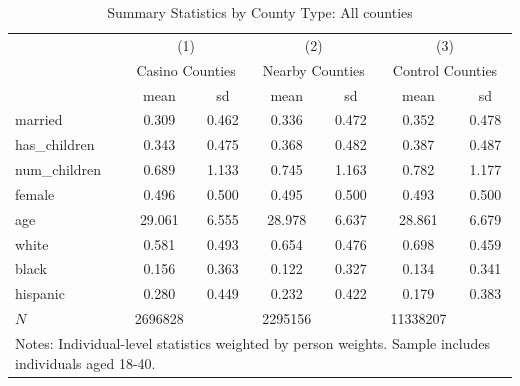 \begin{table}[htbp]\centering
\def\sym#1{\ifmmode^{#1}\else\(^{#1}\)\fi}
\caption{Summary Statistics by County Type: All counties}
\begin{tabular}{l*{3}{cc}}
\hline\hline
            &\multicolumn{2}{c}{(1)}  &\multicolumn{2}{c}{(2)}  &\multicolumn{2}{c}{(3)}  \\
            &\multicolumn{2}{c}{Casino Counties}&\multicolumn{2}{c}{Nearby Counties}&\multicolumn{2}{c}{Control Counties}\\
            &        mean&          sd&        mean&          sd&        mean&          sd\\
\hline
married     &       0.309&       0.462&       0.336&       0.472&       0.352&       0.478\\
has\_children&       0.343&       0.475&       0.368&       0.482&       0.387&       0.487\\
num\_children&       0.689&       1.133&       0.745&       1.163&       0.782&       1.177\\
female      &       0.496&       0.500&       0.495&       0.500&       0.493&       0.500\\
age         &      29.061&       6.555&      28.978&       6.637&      28.861&       6.679\\
white       &       0.581&       0.493&       0.654&       0.476&       0.698&       0.459\\
black       &       0.156&       0.363&       0.122&       0.327&       0.134&       0.341\\
hispanic    &       0.280&       0.449&       0.232&       0.422&       0.179&       0.383\\
\hline
\(N\)       &     2696828&            &     2295156&            &    11338207&            \\
\hline\hline
\multicolumn{7}{l}{\footnotesize Notes: Individual-level statistics weighted by person weights. Sample includes individuals aged 18-40.}\\
\end{tabular}
\end{table}
